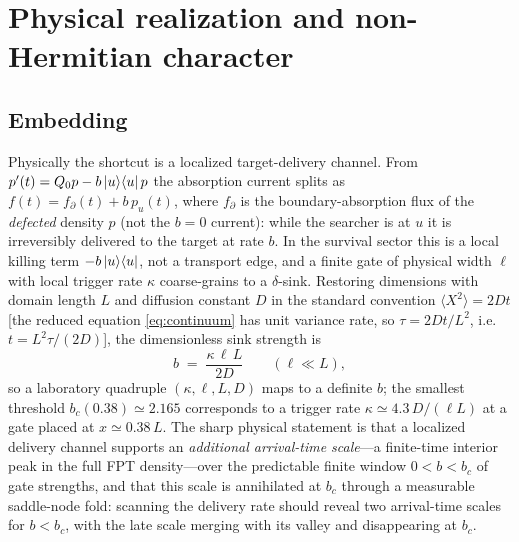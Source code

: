 \documentclass[reprint,amsmath,amssymb,aps,prresearch,longbibliography]{revtex4-2}
\begin{document}
\section{Physical realization and non-Hermitian character}\label{sec:physical}

\subsection{Embedding}\label{sec:physA}
Physically the shortcut is a localized target-delivery channel. From $p'(t)=Q_0p-b\ket{u}\!\bra{u}p$
the absorption current splits as $f(t)=f_\partial(t)+b\,p_u(t)$, where $f_\partial$ is the
boundary-absorption flux of the \emph{defected} density $p$ (not the $b=0$ current): while the
searcher is at $u$ it is irreversibly delivered to the target at rate $b$. In the survival sector this is a local killing term
$-b\ket{u}\!\bra{u}$, not a transport edge, and a finite gate of physical width $\ell$ with local
trigger rate $\kappa$ coarse-grains to a $\delta$-sink. Restoring dimensions with domain length $L$
and diffusion constant $D$ in the standard convention $\langle X^2\rangle=2Dt$ [the reduced equation
\eqref{eq:continuum} has unit variance rate, so $\tau=2Dt/L^2$, i.e.\ $t=L^2\tau/(2D)$], the
dimensionless sink strength is
\begin{equation}
b\;=\;\frac{\kappa\,\ell\,L}{2D}\qquad(\ell\ll L),
\label{eq:nondim}
\end{equation}
so a laboratory quadruple $(\kappa,\ell,L,D)$ maps to a definite $b$; the smallest threshold
$b_c(0.38)\simeq2.165$ corresponds to a trigger rate $\kappa\simeq4.3\,D/(\ell L)$ at a gate placed at
$x\simeq0.38\,L$. The sharp physical statement is that a localized delivery channel supports an
\emph{additional arrival-time scale}---a finite-time interior peak in the full FPT density---over
the predictable finite window $0<b<b_c$ of gate strengths, and that this scale is annihilated at
$b_c$ through a measurable saddle-node fold: scanning the delivery rate should reveal two
arrival-time scales for $b<b_c$, with the late scale merging with its valley and disappearing at
$b_c$.
\end{document}
